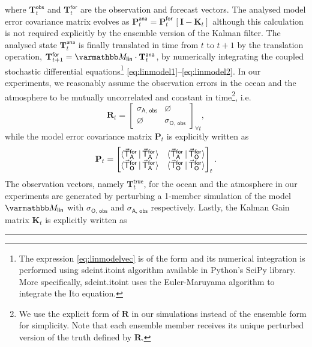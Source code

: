 \documentclass[a4paper,10pt]{article}
\begin{document}
\begin{multicols}{2}
{\noindent}where $\mathbf{T}_t^\mathsf{obs}$ and $\mathbf{T}_t^\mathsf{for}$ are the observation and forecast vectors. The analysed model error covariance matrix evolves as $\mathbf{P}_t^\mathsf{ana} = \mathbf{P}_t^\mathsf{for}\,[\mathbf{I} - \mathbf{K}_t]$ although this calculation is not required explicitly by the ensemble version of the Kalman filter. The analysed state $\mathbf{T}_t^\mathsf{ana}$ is finally translated in time from $t$ to $t + 1$ by the translation operation, $\mathbf{T}_{t+1}^\mathsf{for} = \mlin \cdot \mathbf{T}_{t}^\mathsf{ana}$, by numerically integrating the coupled stochastic differential equations\footnote{The expression \eqref{eq:linmodelvec} is of the  form and its numerical integration is performed using \textsf{sdeint}.\textsf{itoint} algorithm available in Python's \textsf{SciPy} library. More specifically, \textsf{sdeint}.\textsf{itoint} uses the Euler-Maruyama algorithm to integrate the Ito equation.}  \eqref{eq:linmodel1}--\eqref{eq:linmodel2}. In our experiments, we reasonably assume the observation errors in the ocean and the atmosphere to be mutually uncorrelated and constant in time\footnote{We use the explicit form of $\mathbf{R}$ in our simulations instead of the ensemble form for simplicity. Note that each ensemble member receives its unique perturbed version of the truth defined by $\mathbf{R}$.}, i.e.
\begin{equation}
\mathbf{R}_t = 
\begin{bmatrix}
    \sigma_{\mathsf{A},\,\mathsf{obs}} & \varnothing \\
    \varnothing & \sigma_{\mathsf{O},\,\mathsf{obs}}
\end{bmatrix}_{\forall t},
\label{eq:R}
\end{equation}
while the model error covariance matrix $\mathbf{P}_t$ is explicitly written as 
\begin{equation}
\mathbf{P}_t = 
\begin{bmatrix}
    \langle\vec{\mathsf{T}}_\mathsf{A}^\mathsf{for}\,|\,\vec{\mathsf{T}}_\mathsf{A}^\mathsf{for}\rangle & \langle\vec{\mathsf{T}}_\mathsf{A}^\mathsf{for}\,|\,\vec{\mathsf{T}}_\mathsf{O}^\mathsf{for}\rangle \\
    \langle\vec{\mathsf{T}}_\mathsf{O}^\mathsf{for}\,|\,\vec{\mathsf{T}}_\mathsf{A}^\mathsf{for}\rangle & \langle\vec{\mathsf{T}}_\mathsf{O}^\mathsf{for}\,|\,\vec{\mathsf{T}}_\mathsf{O}^\mathsf{for}\rangle
\end{bmatrix}_t.
\label{eq:P}
\end{equation}
The  observation vectors, namely $\mathbf{T}_{t}^\mathsf{true}$, for the ocean and the atmosphere in our experiments are generated by perturbing a 1-member simulation of the model $\mlin$ with $\sigma_{\mathsf{O},\,\mathsf{obs}}$ and $\sigma_{\mathsf{A},\,\mathsf{obs}}$ respectively. Lastly, the Kalman Gain matrix $\mathbf{K}_t$ is explicitly written as 
\noindent\rule{\columnwidth}{0.4pt}
\end{multicols}
\end{document}

